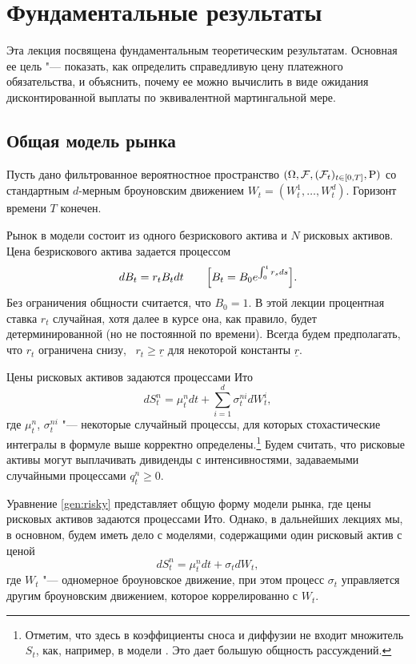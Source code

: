 
\chapter{Фундаментальные результаты}
\label{ch:general}
\chaptertoc

Эта лекция посвящена фундаментальным теоретическим результатам.
Основная ее цель "--- показать, как определить справедливую цену платежного обязательства, и объяснить, почему ее можно вычислить в виде ожидания дисконтированной выплаты по эквивалентной мартингальной мере.


\section{Общая модель рынка}

Пусть дано фильтрованное вероятностное пространство $(\Omega,\mathcal{F},(\mathcal{F}_t)_{t\in[0,T]},\mathrm{P})$ со стандартным $d$-мерным броуновским движением $W_t=(W_t^1,\dots,W_t^d)$. 
Горизонт времени $T$ конечен.

Рынок в модели состоит из одного безрискового актива и $N$ рисковых активов.
Цена безрискового актива задается процессом
\[
d B_t = r_tB_t dt \qquad\Bigl[B_t = B_0 e^{\int_0^t r_s ds}\Bigr].
\] 
Без ограничения общности считается, что $B_0=1$.
В этой лекции процентная ставка $r_t$ случайная, хотя далее в курсе она, как правило, будет детерминированной (но не постоянной по времени).
Всегда будем предполагать, что $r_t$ ограничена снизу, \te\ $r_t\ge\underline r$ для некоторой константы $\underline r$.

Цены рисковых активов задаются процессами Ито
\begin{equation}
\label{gen:risky}
d S_t^n = \mu_t^n dt + \sum_{i=1}^d \sigma^{ni}_t d W_t^i,
\end{equation}
где $\mu_t^n$, $\sigma_t^{ni}$ "--- некоторые случайный процессы, для которых стохастические интегралы в формуле выше корректно определены.\footnote{Отметим, что здесь в коэффициенты сноса и диффузии не входит множитель $S_t$, как, например, в модели \bs.
Это дает большую общность рассуждений.}
Будем считать, что рисковые активы могут выплачивать дивиденды с интенсивностями, задаваемыми случайными процессами $q_t^n\ge0$.

\begin{remark}
Уравнение \eqref{gen:risky} представляет общую форму модели рынка, где цены рисковых активов задаются процессами Ито.
Однако, в дальнейших лекциях мы, в основном, будем иметь дело с моделями, содержащими один рисковый актив с ценой
\begin{equation}
\label{gen:risky-simple}
d S_t^n = \mu_t^n dt + \sigma_t d W_t,
\end{equation}
где $W_t$ "--- одномерное броуновское движение, при этом процесс $\sigma_t$ управляется другим броуновским движением, которое коррелированно с $W_t$.
\end{remark}

